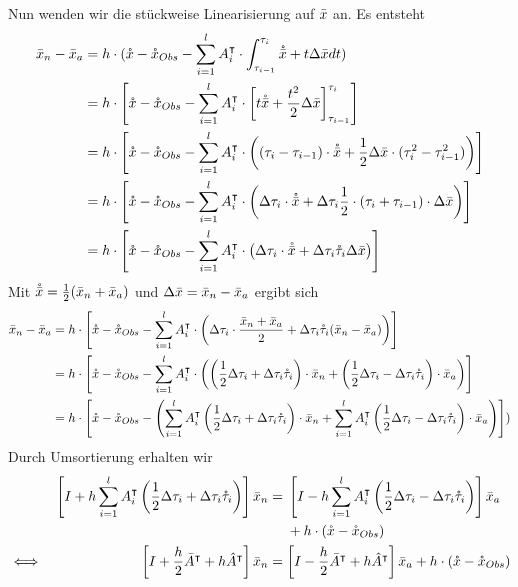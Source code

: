 Nun wenden wir die stückweise Linearisierung auf $\bar{x}$ an. Es entsteht
\begin{align*}
\bar{x}_n - \bar{x}_a &= h\cdot (\mathring{x} -\mathring{x}_{Obs} - \sum_{i=1}^l A_i^\intercal \cdot \int_{\tau_{i-1}}^{\tau_{i}} \mathring{\bar{x}} + t\Delta \bar{x} dt)\\
									&= h\cdot \left[\mathring{x} -\mathring{x}_{Obs} - \sum_{i=1}^l A_i^\intercal \cdot \left[t\mathring{\bar{x}} + \frac{t^2}{2}\Delta \bar{x} \right]_{\tau_{i-1}}^{\tau_i} \right]\\
									&= h\cdot \left[\mathring{x} -\mathring{x}_{Obs} - \sum_{i=1}^l A_i^\intercal \cdot \left( (\tau_i - \tau_{i-1})\cdot \mathring{\bar{x}} + \frac{1}{2}\Delta \bar{x} \cdot(\tau_i^2-\tau_{i-1}^2) \right)\right]\\
									&= h\cdot \left[\mathring{x} -\mathring{x}_{Obs} - \sum_{i=1}^l A_i^\intercal \cdot \left(\Delta \tau_i\cdot \mathring{\bar{x}} +  \Delta \tau_i \frac{1}{2}\cdot(\tau_i+\tau_{i-1})\cdot \Delta \bar{x} \right)\right]\\
									&= h\cdot \left[\mathring{x} -\mathring{x}_{Obs} - \sum_{i=1}^l A_i^\intercal \cdot \left( \Delta \tau_i\cdot \mathring{\bar{x}} +  \Delta \tau_i \mathring{\tau}_i \Delta \bar{x} \right)\right]\\
\end{align*}
Mit $\mathring{\bar{x}} =\frac{1}{2}(\bar{x}_n + \bar{x}_a) $ und $\Delta \bar{x} =\bar{x}_n - \bar{x}_a $ ergibt sich
\begin{align*}
\bar{x}_n - \bar{x}_a &= h\cdot \left[\mathring{x} -\mathring{x}_{Obs} - \sum_{i=1}^l A_i^\intercal \cdot \left( \Delta \tau_i\cdot \frac{\bar{x}_n + \bar{x}_a}{2} +  \Delta \tau_i \mathring{\tau}_i (\bar{x}_n - \bar{x}_a) \right)\right]\\
 &= h\cdot \left[\mathring{x} -\mathring{x}_{Obs} - \sum_{i=1}^l A_i^\intercal \cdot \left( \left(\frac{1}{2} \Delta \tau_i +\Delta \tau_i \mathring{\tau}_i\right) \cdot \bar{x}_n  +  \left(\frac{1}{2}\Delta \tau_i-\Delta \tau_i \mathring{\tau}_i\right) \cdot \bar{x}_a \right)\right]\\
 &= h\cdot \left[\mathring{x} -\mathring{x}_{Obs} -  \left( \sum_{i=1}^l A_i^\intercal \left(\frac{1}{2} \Delta \tau_i +\Delta \tau_i \mathring{\tau}_i\right) \cdot \bar{x}_n  + \sum_{i=1}^l A_i^\intercal  \left(\frac{1}{2}\Delta \tau_i-\Delta \tau_i \mathring{\tau}_i\right) \cdot \bar{x}_a \right)\right])\\
\end{align*}
Durch Umsortierung erhalten wir
\begin{align*}
&& \left[I +h\sum_{i=1}^l A_i^\intercal \left(\frac{1}{2} \Delta \tau_i +\Delta \tau_i \mathring{\tau}_i\right) \right]\bar{x}_n &= 
\begin{aligned}[t]
&\left[I - h\sum_{i=1}^l A_i^\intercal  \left(\frac{1}{2}\Delta \tau_i-\Delta \tau_i \mathring{\tau}_i\right)\right]\bar{x}_a \\
& +h\cdot (\mathring{x} -\mathring{x}_{Obs})
\end{aligned}\\
\iff&& \left[I +\frac{h}{2} \bar{A}^\intercal +h\hat{A}^\intercal\right]\bar{x}_n &= \left[I - \frac{h}{2}\bar{A}^\intercal + h\hat{A}^\intercal\right]\bar{x}_a  +h\cdot (\mathring{x} -\mathring{x}_{Obs})\\
\end{align*}
